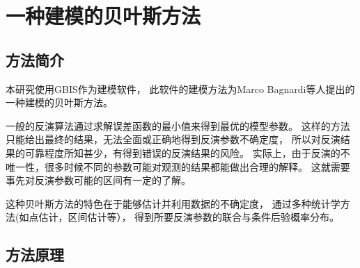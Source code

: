 \chapter{一种建模的贝叶斯方法}
\label{ch:pm}
\section{方法简介}
本研究使用GBIS\cite{bagnardiInversionSurfaceDeformation2018}作为建模软件，
此软件的建模方法为Marco Bagnardi等人提出的一种建模的贝叶斯方法。

一般的反演算法通过求解误差函数的最小值来得到最优的模型参数。
这样的方法只能给出最终的结果，无法全面或正确地得到反演参数不确定度，
所以对反演结果的可靠程度所知甚少，有得到错误的反演结果的风险。
实际上，由于反演的不唯一性，很多时候不同的参数可能对观测的结果都能做出合理的解释。
这就需要事先对反演参数可能的区间有一定的了解。

这种贝叶斯方法的特色在于能够估计并利用数据的不确定度，
通过多种统计学方法(如点估计，区间估计等），
得到所要反演参数的联合与条件后验概率分布。

\section{方法原理}

